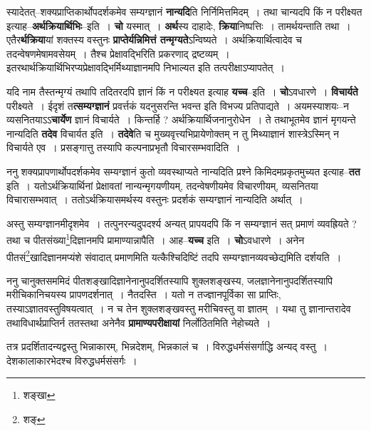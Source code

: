 \documentclass[article,12pt,a4paper]{memoir}
\begin{document}
	  \pstart स्यादेतत्--शक्यप्राप्तिकार्थोपदर्शकमेव सम्यग्ज्ञानं\leavevmode{} \textbf{नान्यदि}ति निर्निमित्तमिदम् । तथा चान्यदपि किं न परीक्ष्यत इत्याह--\textbf{अर्थक्रियार्थिभिः}--इति । \textbf{चो} यस्मात् । \textbf{अर्थ}स्य दाहादेः, \textbf{क्रिया}निष्पत्तिः । तामर्थयन्ताति तथा । एतैर\textbf{र्थक्रिया}यां शक्तस्य वस्तुनः \textbf{प्राप्तेर्यन्निमित्तं तन्मृग्यते}ऽन्विष्यते । अर्थक्रियार्थित्वादेव च तदन्वेषणमेषामवसेयम् । तैश्च प्रेक्षावद्भिरिति प्रकरणाद् द्रष्टव्यम् । इतरथार्थक्रियार्थिभिरप्यप्रेक्षावद्भिर्मिथ्याज्ञानमपि निभाल्यत इति तत्परीक्षाऽप्यापतेत् ।
	\pend
      

	  \pstart यदि नाम तैस्तन्मृग्यं तथापि तदितरदपि ज्ञानं किं न परीक्ष्यत इत्याह \textbf{यच्च}--इति । \textbf{चो}ऽवधारणे । \textbf{विचार्यते} परीक्ष्यते । ईदृशं त\textbf{त्सम्यग्ज्ञानं} प्रवर्त्तकं यदनुसरन्ति भवन्त इति विभज्य प्रतिपाद्यते । अयमस्याशयः--न व्यसनितयाऽऽ\textbf{चार्येण} ज्ञानं विचार्यते । किन्तर्हि ? अर्थक्रियार्थिजनानुरोधेन । ते तथाभूतमेव ज्ञानं मृगयन्ते नान्यदिति \textbf{तदेव} विचार्यत इति । \textbf{तदेवे}ति च मुख्यवृत्त्यभिप्रायेणोक्तम् न तु मिथ्याज्ञानं शास्त्रेऽस्मिन् न विचार्यते एव । प्रसङ्गात्तु तस्यापि कल्पनाप्रभृतौ विचारसम्भवादिति ।
	\pend
      

	  \pstart ननु शक्यप्रापणार्थोपदर्शकमेव सम्यग्ज्ञानं कुतो व्यवस्थाप्यते नान्यदिति प्रश्ने किमिदमप्रकृतमुच्यत इत्याह--\textbf{तत} इति । यतोऽर्थक्रियार्थिनां प्रेक्षावतां नान्यन्मृगयणीयम्, तदन्वेषणीयमेव विचारणीयम्, व्यसनितया विचारासम्भवात् । ततोऽर्थक्रियासमर्थस्य वस्तुनः प्रदर्शकं सम्यग्ज्ञानं नान्यदिति अर्थात् ।
	\pend
      

	  \pstart अस्तु सम्यग्ज्ञानमीदृशमेव । तत्पुनरन्यदुपदर्श्य अन्यत् प्रापयदपि किं न सम्यग्ज्ञानं सत् प्रमाणं व्यवह्रियते ? तथा च पीतसंख्या\footnote{शङ्खा}\-दिज्ञानमपि प्रामाण्यान्नापैति । आह--\textbf{यच्च} इति । \textbf{चो}ऽवधारणे । अनेन पीतसं\footnote{शङ्}\-खादिज्ञानमप्यंशे संवादात् प्रमाणमिति यत्कैश्चिदिष्टिं तदपि सम्यग्ज्ञानव्यवच्छेद्यमिति दर्शयति ।
	\pend
      

	  \pstart ननु चानुक्तसममिदं पीतशङ्खादिज्ञानेनानुपदर्शितस्यापि शुक्लशङ्खस्य, जलज्ञानेनानुपदर्शितस्यापि मरीचिकानिचयस्य प्रापणदर्शनात् । नैतदस्ति । यतो न तज्ज्ञानपूर्विका सा प्राप्तिः, तस्याऽज्ञातवस्तुविषयत्वात् । न च तेन शुक्लशङ्खवस्तु मरीचिवस्तु वा ज्ञातम् । यथा तु ज्ञानान्तरादेव तथाविधार्थप्राप्तिर्न ततस्तथा अनेनैव \textbf{प्रामाण्यपरीक्षायां} निर्लोठितमिति नेहोच्यते ।
	\pend
	  \bigskip
	  \begingroup
	

	  \pstart तत्र प्रदर्शितादन्यद्वस्तु भिन्नाकारम्, भिन्नदेशम्, भिन्नकालं च । विरुद्धधर्मसंसर्गाद्धि अन्यद् वस्तु । देशकालाकारभेदश्च विरुद्धधर्मसंसर्गः ।
	\pend
       
\end{document}
